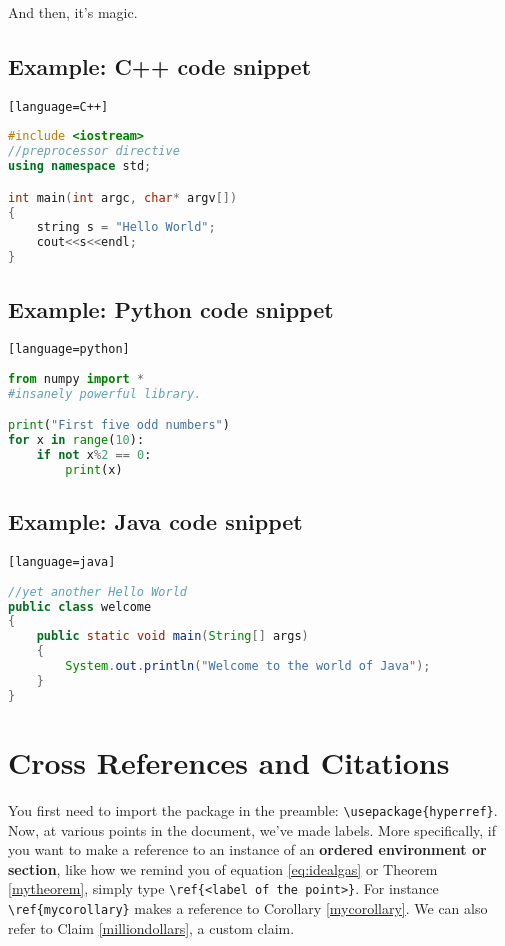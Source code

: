 \documentclass[12pt, letterpaper]{article}
\theoremstyle{remark}
\newcounter{claim}
\begin{document}
And then, it's magic.

\newpage

\subsection{Example: C++ code snippet}
\verb![language=C++]!
\begin{lstlisting}[language=C++]
#include <iostream>
//preprocessor directive
using namespace std;

int main(int argc, char* argv[])
{
    string s = "Hello World";
    cout<<s<<endl;
}
\end{lstlisting}

\subsection{Example: Python code snippet}
\verb![language=python]!
\begin{lstlisting}[language=python]
from numpy import *
#insanely powerful library.

print("First five odd numbers")
for x in range(10):
    if not x%2 == 0:
        print(x)
\end{lstlisting}

\subsection{Example: Java code snippet}
\verb![language=java]!
\begin{lstlisting}[language=java]
//yet another Hello World
public class welcome
{
    public static void main(String[] args)
    {
        System.out.println("Welcome to the world of Java");
    }
}
\end{lstlisting}


\section{Cross References and Citations}
You first need to import the package in the preamble: \verb!\usepackage{hyperref}!. Now, at various points in the document, we've made labels. More specifically, if you want to make a reference to an instance of an \textbf{ordered environment or section}, like how we remind you of equation \ref{eq:idealgas} or Theorem \ref{mytheorem}, simply type \verb!\ref{<label of the point>}!. For instance \verb!\ref{mycorollary}! makes a reference to Corollary \ref{mycorollary}. We can also refer to Claim \ref{milliondollars}, a custom claim.
\end{document}
